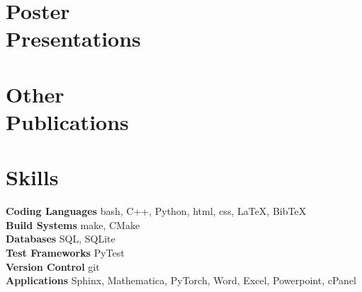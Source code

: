 \documentclass[margin,line]{resume}
\begin{document}
\begin{resume}
    \section{\mysidestyle Poster\\Presentations}
    \begin{bibenum}
        \item {}
        \item {}
    \end{bibenum}
    \section{\mysidestyle Other\\Publications}
    \begin{bibenum}
         \item {}
    \end{bibenum}


    \section{\mysidestyle Skills}
                \textbf{Coding Languages} \hfill bash, C++, Python, html, css, \LaTeX, BibTeX \vspace{.5mm}\\%
                \textbf{Build Systems} \hfill make, CMake\vspace{.5mm}\\%
                \textbf{Databases} \hfill SQL, SQLite\vspace{.5mm}\\%
                \textbf{Test Frameworks} \hfill PyTest\vspace{.5mm}\\%
                \textbf{Version Control} \hfill git\vspace{.5mm}\\%
                \textbf{Applications} \hfill Sphinx, Mathematica, PyTorch, Word, Excel, Powerpoint, cPanel\vspace{.5mm}%


\end{resume}
\end{document}
